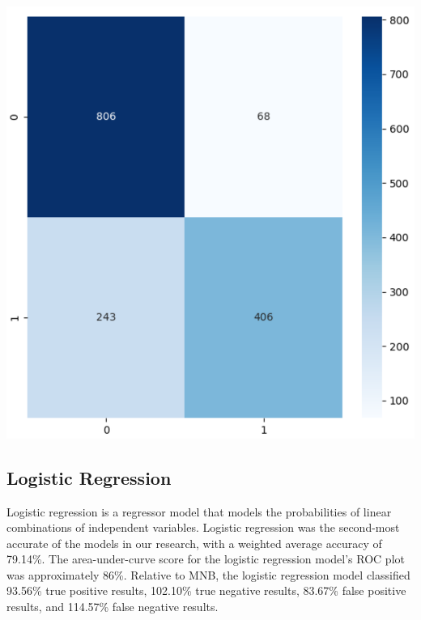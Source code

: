 \documentclass[11pt]{diazessay} %
\begin{document}
\begin{minipage}[b]{.45\linewidth}
\includegraphics[width=\linewidth]{images/rf_heatmap.png}
\end{minipage}\hfill

\subsection{Logistic Regression}

Logistic regression is a regressor model that models the probabilities of linear combinations of independent variables. Logistic regression was the second-most accurate of the models in our research, with a weighted average accuracy of 79.14\%. The area-under-curve score for the logistic regression model's ROC plot was approximately 86\%. Relative to MNB, the logistic regression model classified 93.56\% true positive results, 102.10\% true negative results, 83.67\% false positive results, and 114.57\% false negative results.
\end{document}
